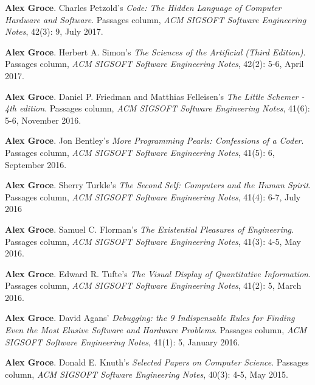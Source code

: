 \documentclass[ComputerScience]{vita}
\begin{document}
\begin{vita}
\begin{Columns, Book Reviews, and Magazine Articles}
\item {\bf Alex Groce}.
\newblock Charles Petzold's \emph{Code: The Hidden Language of Computer Hardware and Software}.
\newblock Passages column, \emph{ACM SIGSOFT Software Engineering Notes}, 42(3): 9, July 2017.


\item {\bf Alex Groce}.
\newblock Herbert A. Simon's \emph{The Sciences of the Artificial (Third Edition)}.
\newblock Passages column, \emph{ACM SIGSOFT Software Engineering Notes}, 42(2): 5-6, April 2017.

\item {\bf Alex Groce}.
\newblock Daniel P. Friedman and Matthias Felleisen's \emph{The Little Schemer - 4th edition}.
\newblock Passages column, \emph{ACM SIGSOFT Software Engineering Notes}, 41(6): 5-6, November 2016.

\item {\bf Alex Groce}.
\newblock Jon Bentley's \emph{More Programming Pearls: Confessions of a Coder}.
\newblock Passages column, \emph{ACM SIGSOFT Software Engineering Notes}, 41(5): 6, September 2016.

\item {\bf Alex Groce}.
\newblock Sherry Turkle's \emph{The Second Self: Computers and the Human Spirit}.
\newblock Passages column, \emph{ACM SIGSOFT Software Engineering Notes}, 41(4): 6-7, July 2016

\item {\bf Alex Groce}.
\newblock Samuel C. Florman's \emph{The Existential Pleasures of Engineering}.
\newblock Passages column, \emph{ACM SIGSOFT Software Engineering Notes}, 41(3): 4-5, May 2016.


\item {\bf Alex Groce}.
\newblock Edward R. Tufte's \emph{The Visual Display of Quantitative Information}.
\newblock Passages column, \emph{ACM SIGSOFT Software Engineering Notes}, 41(2): 5, March 2016.

\item {\bf Alex Groce}.
\newblock David Agans' \emph{Debugging: the 9 Indispensable Rules for Finding Even the Most Elusive Software and Hardware Problems}. 
\newblock Passages column, \emph{ACM SIGSOFT Software Engineering Notes}, 41(1): 5, January 2016.


\item {\bf Alex Groce}.
\newblock Donald E. Knuth's \emph{Selected Papers on Computer Science}.
\newblock Passages column, \emph{ACM SIGSOFT Software Engineering Notes}, 40(3): 4-5, May 2015.


\end{Columns, Book Reviews, and Magazine Articles}
\end{vita}
\end{document}
